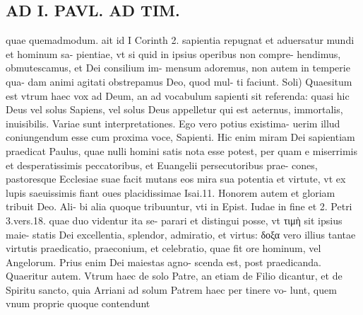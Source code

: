 \documentclass{article}
\begin{document}
\begin{pages}
\section*{AD I. PAVL. AD TIM. }
\marginpar{[ p.32 ]}\pstart quae quemadmodum. ait id I Corinth 2. sapientia repugnat et aduersatur mundi et hominum sa- pientiae, vt si quid in ipsius operibus non compre- hendimus, obmutescamus, et Dei consilium im- mensum adoremus, non autem in temperie qua- dam animi agitati obstrepamus Deo, quod mul- ti faciunt.  \pend\pstart Soli) Quaesitum est vtrum haec vox ad Deum, an ad vocabulum sapienti sit referenda: quasi hic Deus vel solus Sapiens, vel solus Deus appelletur qui est aeternus, immortalis, inuisibilis. Variae sunt interpretationes. Ego vero potius existima- uerim illud coniungendum esse cum proxima voce, Sapienti. Hic enim miram Dei sapientiam praedicat Paulus, quae nulli homini satis nota esse potest, per quam e miserrimis et desperatissimis peccatoribus, et Euangelii persecutoribus prae- cones, pastoresque Ecclesiae suae facit mutans eos mira sua potentia et virtute, vt ex lupis saeuissimis fiant oues placidissimae Isai.11.  \pend\pstart Honorem autem et gloriam tribuit Deo. Ali- bi alia quoque tribuuntur, vti in Epist. Iudae in fine et 2. Petri 3.vers.18. quae duo videntur ita se- parari et distingui posse, vt τιμὴ sit ipsius maie- statis Dei excellentia, splendor, admiratio, et virtus: δοξα vero illius tantae virtutis praedicatio, praeconium, et celebratio, quae fit ore hominum, vel Angelorum. Prius enim Dei maiestas agno- scenda est, post praedicanda.  \pend\pstart Quaeritur autem. Vtrum haec de solo Patre, an etiam de Filio dicantur, et de Spiritu sancto, quia Arriani ad solum Patrem haec per tinere vo- lunt, quem vnum proprie quoque contendunt  \pend

\end{pages}
\end{document}
